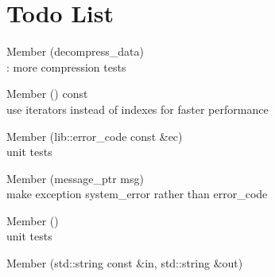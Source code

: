 \chapter{Todo List}
\hypertarget{todo}{}\label{todo}

\begin{DoxyRefList}
\item[Member \doxylink{permessage__deflate_8cpp_a640c2ff3b439cceb412d897c8953216b}{BOOST\+\_\+\+AUTO\+\_\+\+TEST\+\_\+\+CASE} (decompress\+\_\+data)]\hfill \\
\label{todo__todo000002}%
%
\+: more compression tests  
\item[Member \doxylink{classfc_1_1path_a12a75eca015d0c9880e2c062e371d08d}{fc\+::path\+::windows\+\_\+string} () const]\hfill \\
\label{todo__todo000001}%
%
use iterators instead of indexes for faster performance  
\item[Member \doxylink{classwebsocketpp_1_1connection_a867f94b82788e978ea116d50cf83d72e}{websocketpp\+::connection\texorpdfstring{$<$}{<} config \texorpdfstring{$>$}{>}\+::handle\+\_\+write\+\_\+frame} (lib\+::error\+\_\+code const \&ec)]\hfill \\
\label{todo__todo000007}%
%
unit tests 
\item[Member \doxylink{classwebsocketpp_1_1connection_a29900da403dbafab8095c0989104be90}{websocketpp\+::connection\texorpdfstring{$<$}{<} config \texorpdfstring{$>$}{>}\+::send} (message\+\_\+ptr msg)]\hfill \\
\label{todo__todo000005}%
%
make exception system\+\_\+error rather than error\+\_\+code 
\item[Member \doxylink{classwebsocketpp_1_1connection_a8d26a29e90d4847f3882c280112c6b60}{websocketpp\+::connection\texorpdfstring{$<$}{<} config \texorpdfstring{$>$}{>}\+::write\+\_\+frame} ()]\hfill \\
\label{todo__todo000006}%
%
unit tests 
\item[Member \doxylink{classwebsocketpp_1_1extensions_1_1permessage__deflate_1_1enabled_a3002ea83fbc0066f9ecf23b4be082365}{websocketpp\+::extensions\+::permessage\+\_\+deflate\+::enabled\texorpdfstring{$<$}{<} config \texorpdfstring{$>$}{>}\+::compress} (std\+::string const \&in, std\+::string \&out)]\hfill \\
\label{todo__todo000014}%
%

\end{DoxyRefList}
